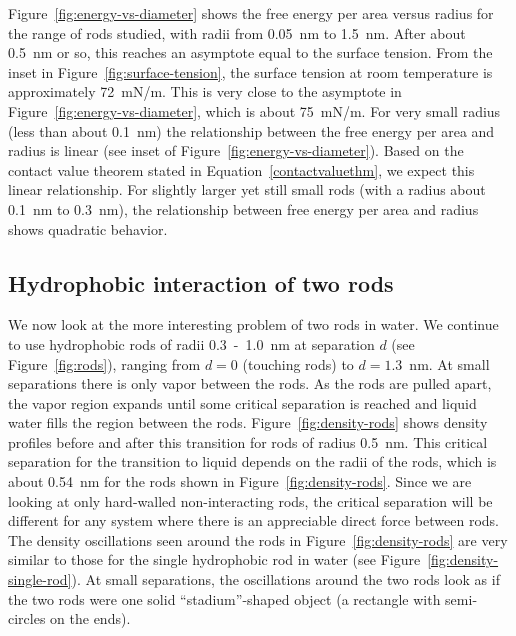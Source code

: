 \documentclass[letterpaper,twocolumn,amsmath,amssymb,prb]{revtex4-1}
\begin{document}
Figure~\ref{fig:energy-vs-diameter} shows the free energy per area versus
radius for the range of rods studied, with radii from 0.05~nm to 1.5~nm. After 
about 0.5~nm or so, this reaches
an asymptote equal to the surface tension. From the inset in 
Figure~\ref{fig:surface-tension}, the surface tension at room 
temperature is approximately 72~mN/m. This is very close to the 
asymptote in Figure~\ref{fig:energy-vs-diameter}, which is about 75~mN/m. 
For very small radius (less than about 0.1~nm) the
relationship between the free energy per area and radius is linear (see inset
of Figure~\ref{fig:energy-vs-diameter}). Based on the contact value theorem
stated in Equation~\ref{contactvaluethm}, we expect this linear relationship.
For slightly larger yet still small rods (with a radius about 0.1~nm to 
0.3~nm), the relationship between free energy per area and radius shows
quadratic behavior.

\subsection{Hydrophobic interaction of two rods}

We now look at the more interesting problem of two rods in water. We continue to
use hydrophobic rods of radii 0.3~-~1.0~nm at separation $d$ 
(see Figure~\ref{fig:rods}), ranging from $d=0$ 
(touching rods) to $d=1.3$~nm. At small
separations there is only vapor between the rods. As the rods are
pulled apart, the vapor region expands until some critical separation is
reached and liquid water fills the region between the rods. 
Figure~\ref{fig:density-rods} 
shows density profiles before and after this transition
for rods of radius 0.5~nm. This critical separation for the transition to liquid depends
on the radii of the rods, which is about 0.54~nm for the rods shown in 
Figure~\ref{fig:density-rods}.
Since we are looking at only hard-walled
non-interacting rods, the critical separation will be
different for any system where there is an appreciable direct force between rods. 
The density oscillations seen around the rods in Figure~\ref{fig:density-rods} 
are very similar to
those for the single hydrophobic rod in water (see Figure~\ref{fig:density-single-rod}).
At small separations, the oscillations around the two rods look as if the two rods were one
solid ``stadium''-shaped object (a rectangle with semi-circles on the ends).
\end{document}
